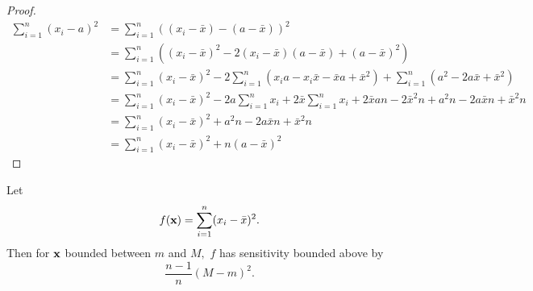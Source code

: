 \documentclass[11pt, oneside]{article}   	%
\begin{document}
\begin{proof}
\begin{align*}
\sum_{i=1}^n (x_i - a)^2 &= \sum_{i=1}^n \left( (x_i - \bar{x}) - (a-\bar{x}) \right)^2\\
	&= \sum_{i=1}^n \left( (x_i - \bar{x})^2 -2(x_i - \bar{x})(a-\bar{x}) + (a-\bar{x})^2\right)\\
	&= \sum_{i=1}^n (x_i - \bar{x})^2 - 2\sum_{i=1}^n \left(x_ia-x_i\bar{x} -\bar{x}a + \bar{x}^2\right) + \sum_{i=1}^n \left( a^2 -2a\bar{x} + \bar{x}^2\right)\\
	&=  \sum_{i=1}^n (x_i - \bar{x})^2 -2a\sum_{i=1}^n x_i + 2\bar{x}\sum_{i=1}^n x_i + 2\bar{x}an - 2\bar{x}^2n + a^2n-2a\bar{x}n+\bar{x}^2n\\
	&=  \sum_{i=1}^n (x_i - \bar{x})^2 + a^2n-2a\bar{x}n+\bar{x}^2n\\
	&=  \sum_{i=1}^n (x_i - \bar{x})^2 + n(a-\bar{x})^2
\end{align*}

\end{proof}

\begin{theorem}
Let 
$$ f(\textbf{x}) = \sum_{i=1}^n (x_i - \bar{x})^2.$$
Then for $\textbf{x}$ bounded between $m$ and $M,$ $f$ has sensitivity bounded above by
$$\frac{n-1}{n} (M-m)^2.$$
\end{theorem}
\end{document}
